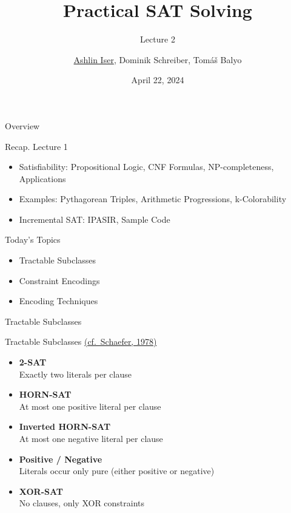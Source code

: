 \documentclass[t]{sdqbeamer}
\title[SAT Solving]{Practical SAT Solving}
\subtitle{Lecture 2}
\author{\underline{Ashlin Iser}, Dominik Schreiber, Tom\'a\v{s} Balyo}
\date{April 22, 2024}
\begin{document}
\begin{frame}
	\thispagestyle{empty}
	\titlepage
\end{frame}

\begin{frame}{Overview}
	\begin{block}{Recap. Lecture 1}
		\begin{itemize}\setlength{\itemsep}{1em}
			\item Satisfiability: Propositional Logic, CNF Formulas, NP-completeness, Applications
			\item Examples: Pythagorean Triples, Arithmetic Progressions, k-Colorability
			\item Incremental SAT: IPASIR, Sample Code
		\end{itemize}
	\end{block}
	\begin{block}{Today's Topics}
		\begin{itemize}\setlength{\itemsep}{1em}
			\item Tractable Subclasses
			\item Constraint Encodings
			\item Encoding Techniques
		\end{itemize}
	\end{block}
\end{frame}

\begin{frame}{Tractable Subclasses}
\pause
\begin{block}{Tractable Subclasses \href{https://doi.org/10.1145/800133.804350}{(cf.~Schaefer, 1978)}}
	\begin{itemize}\setlength{\itemsep}{1em}
		\item \textbf{2-SAT}\\Exactly two literals per clause
		\item \textbf{HORN-SAT}\\At most one positive literal per clause
		\item \textbf{Inverted HORN-SAT}\\At most one negative literal per clause
		\item \textbf{Positive / Negative}\\Literals occur only pure (either positive or negative)
		\item \textbf{XOR-SAT}\\No clauses, only XOR constraints
	\end{itemize}
\end{block}
\end{frame}
\end{document}
